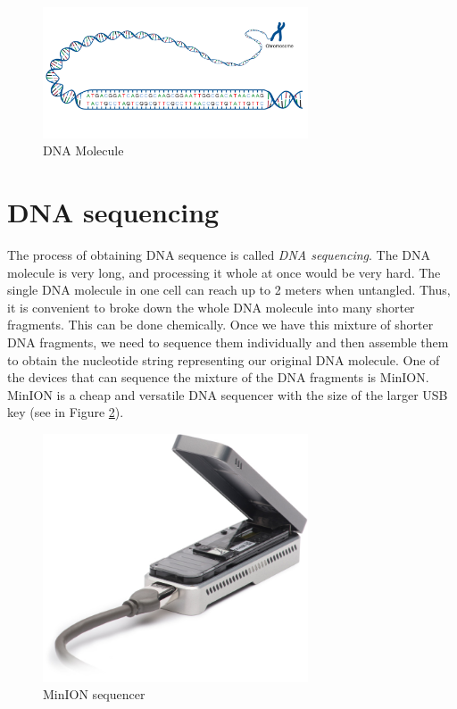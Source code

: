 \begin{figure}
\centerline{\includegraphics[width=0.7\textwidth, height=0.3\textheight]{images/acgt}}
\caption[DNA]{DNA Molecule}
\label{obr:acgt}
\end{figure}

\section{DNA sequencing}


The process of obtaining DNA sequence is called \textit{DNA sequencing}.
The DNA molecule is very long, and processing it whole at once would be very hard.
The single DNA molecule in one cell can reach up to 2 meters when untangled.
Thus, it is convenient to broke down the whole DNA molecule into many shorter fragments.
This can be done chemically. Once we have this mixture of shorter DNA fragments, we need to sequence them
individually and then assemble them to obtain the nucleotide string representing
our original DNA molecule. One of the devices that can sequence the mixture of the
DNA fragments is MinION\cite{lu2016oxford}. MinION is a cheap and versatile DNA sequencer
with the size of the larger USB key (see in Figure \ref{obr:minIon}).

\begin{figure}
\centerline{\includegraphics[width=0.7\textwidth, height=0.3\textheight]{images/minion}}
\caption[MinION]{MinION sequencer}
\label{obr:minIon}
\end{figure}

